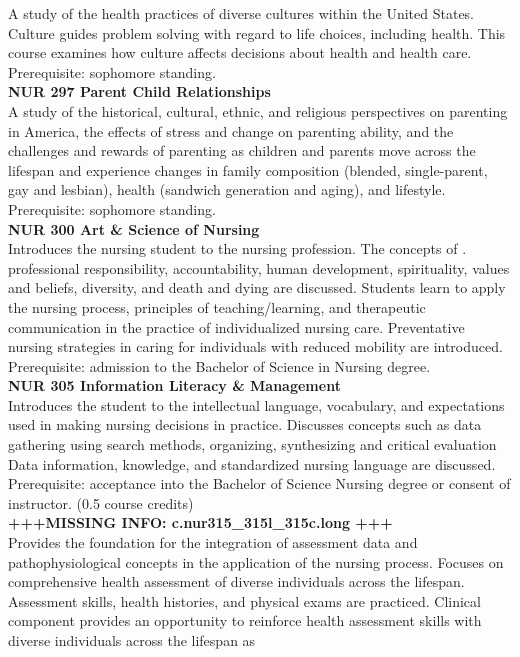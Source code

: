 \documentclass[
  letterpaper,
]{scrbook}
\begin{document}
A study of the health practices of diverse cultures within the United
States. Culture guides problem solving with regard to life choices,
including health. This course examines how culture affects decisions
about health and health care. Prerequisite: sophomore standing.\\
\textbf{NUR 297 Parent Child Relationships}\\
A study of the historical, cultural, ethnic, and religious perspectives
on parenting in America, the effects of stress and change on parenting
ability, and the challenges and rewards of parenting as children and
parents move across the lifespan and experience changes in family
composition (blended, single-parent, gay and lesbian), health (sandwich
generation and aging), and lifestyle. Prerequisite: sophomore
standing.\\
\textbf{NUR 300 Art \& Science of Nursing}\\
Introduces the nursing student to the nursing profession. The concepts
of . professional responsibility, accountability, human development,
spirituality, values and beliefs, diversity, and death and dying are
discussed. Students learn to apply the nursing process, principles of
teaching/learning, and therapeutic communication in the practice of
individualized nursing care. Preventative nursing strategies in caring
for individuals with reduced mobility are introduced. Prerequisite:
admission to the Bachelor of Science in Nursing degree.\\
\textbf{NUR 305 Information Literacy \& Management}\\
Introduces the student to the intellectual language, vocabulary, and
expectations used in making nursing decisions in practice. Discusses
concepts such as data gathering using search methods, organizing,
synthesizing and critical evaluation Data information, knowledge, and
standardized nursing language are discussed. Prerequisite: acceptance
into the Bachelor of Science Nursing degree or consent of instructor.
(0.5 course credits)\\
\textbf{+++MISSING INFO: c.nur315\_315l\_315c.long +++}\\
Provides the foundation for the integration of assessment data and
pathophysiological concepts in the application of the nursing process.
Focuses on comprehensive health assessment of diverse individuals across
the lifespan. Assessment skills, health histories, and physical exams
are practiced. Clinical component provides an opportunity to reinforce
health assessment skills with diverse individuals across the lifespan as
\end{document}
